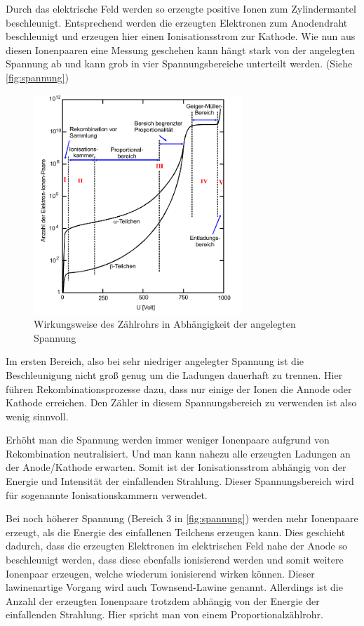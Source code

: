 Durch das elektrische Feld werden so erzeugte positive Ionen zum Zylindermantel beschleunigt.
Entsprechend werden die erzeugten Elektronen zum Anodendraht beschleunigt und erzeugen hier einen Ionisationsstrom zur Kathode.
Wie nun aus diesen Ionenpaaren eine Messung geschehen kann hängt stark von der angelegten Spannung ab und kann grob in vier Spannungsbereiche unterteilt werden. (Siehe \autoref{fig:spannung})

\begin{figure}
    \centering
    \includegraphics[width=0.7\textwidth]{images/skizze_1.png}
    \caption{Wirkungsweise des Zählrohrs in Abhängigkeit der angelegten Spannung}
    \label{fig:spannung}
\end{figure}


Im ersten Bereich, also bei sehr niedriger angelegter Spannung ist die Beschleunigung nicht groß genug um die Ladungen dauerhaft zu trennen.
Hier führen Rekombinationsprozesse dazu, dass nur einige der Ionen die Annode oder Kathode erreichen.
Den Zähler in diesem Spannungsbereich zu verwenden ist also wenig sinnvoll.

Erhöht man die Spannung werden immer weniger Ionenpaare aufgrund von Rekombination neutralisiert.
Und man kann nahezu alle erzeugten Ladungen an der Anode/Kathode erwarten.
Somit ist der Ionisationsstrom abhängig von der Energie und Intensität der einfallenden Strahlung.
Dieser Spannungsbereich wird für sogenannte Ionisationskammern verwendet.

Bei noch höherer Spannung (Bereich 3 in \autoref{fig:spannung}) werden mehr Ionenpaare erzeugt, als die Energie des einfallenen Teilchens erzeugen kann.
Dies geschieht dadurch, dass die erzeugten Elektronen im elektrischen Feld nahe der Anode so beschleunigt werden, dass diese ebenfalls ionisierend werden und somit weitere Ionenpaar erzeugen, welche wiederum ionisierend wirken können.
Dieser lawinenartige Vorgang wird auch Townsend-Lawine genannt.
Allerdings ist die Anzahl der erzeugten Ionenpaare trotzdem abhängig von der Energie der einfallenden Strahlung.
Hier spricht man von einem Proportionalzählrohr.

